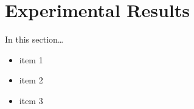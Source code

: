 \documentclass[../techreport.tex]{subfiles}
\begin{document}
\section{Experimental Results}
\label{sec:experiments}
In this section\ldots
\begin{itemize}
	\item item 1
	\item item 2
	\item item 3
\end{itemize}
\lipsum[18-20]
\end{document}
